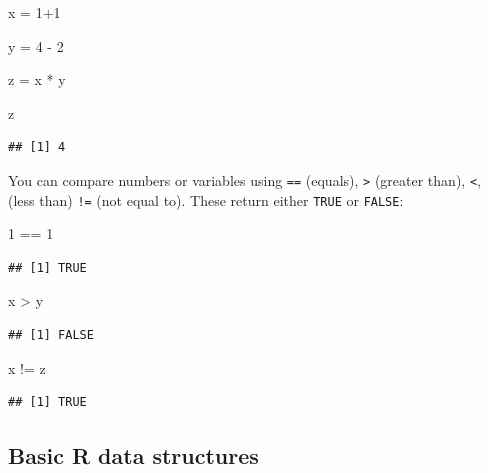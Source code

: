 \documentclass[
]{book}
\newenvironment{Shaded}{\begin{snugshade}}{\end{snugshade}}
\newcommand{\DecValTok}[1]{\textcolor[rgb]{0.00,0.00,0.81}{#1}}
\newcommand{\NormalTok}[1]{#1}
\newcommand{\OtherTok}[1]{\textcolor[rgb]{0.56,0.35,0.01}{#1}}
\newcommand{\SpecialCharTok}[1]{\textcolor[rgb]{0.00,0.00,0.00}{#1}}
\begin{document}
\begin{Shaded}
\begin{Highlighting}[]
\NormalTok{x }\OtherTok{=} \DecValTok{1}\SpecialCharTok{+}\DecValTok{1}

\NormalTok{y }\OtherTok{=} \DecValTok{4} \SpecialCharTok{{-}} \DecValTok{2}

\NormalTok{z }\OtherTok{=}\NormalTok{ x }\SpecialCharTok{*}\NormalTok{ y}

\NormalTok{z}
\end{Highlighting}
\end{Shaded}

\begin{verbatim}
## [1] 4
\end{verbatim}

You can compare numbers or variables using \texttt{==} (equals), \texttt{\textgreater{}} (greater than), \texttt{\textless{}}, (less than) \texttt{!=} (not equal to). These return either \texttt{TRUE} or \texttt{FALSE}:

\begin{Shaded}
\begin{Highlighting}[]
\DecValTok{1} \SpecialCharTok{==} \DecValTok{1}
\end{Highlighting}
\end{Shaded}

\begin{verbatim}
## [1] TRUE
\end{verbatim}

\begin{Shaded}
\begin{Highlighting}[]
\NormalTok{x }\SpecialCharTok{\textgreater{}}\NormalTok{ y}
\end{Highlighting}
\end{Shaded}

\begin{verbatim}
## [1] FALSE
\end{verbatim}

\begin{Shaded}
\begin{Highlighting}[]
\NormalTok{x }\SpecialCharTok{!=}\NormalTok{ z}
\end{Highlighting}
\end{Shaded}

\begin{verbatim}
## [1] TRUE
\end{verbatim}

\hypertarget{basic-r-data-structures}{%
\subsection{Basic R data structures}\label{basic-r-data-structures}}
\end{document}
